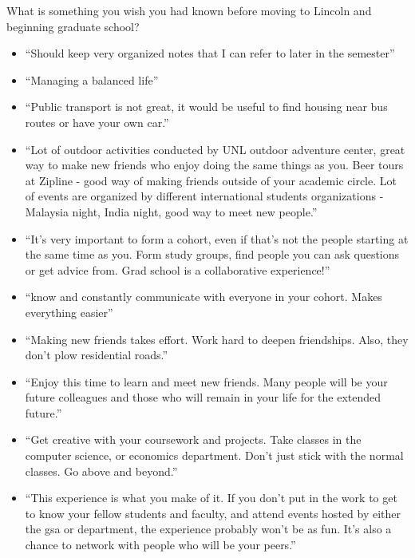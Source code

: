 \documentclass[
  12pt,
]{book}
\providecommand{\tightlist}{%
  \setlength{\itemsep}{0pt}\setlength{\parskip}{0pt}}
\begin{document}
What is something you wish you had known before moving to Lincoln and beginning graduate school?

\begin{itemize}
\tightlist
\item
  ``Should keep very organized notes that I can refer to later in the semester''
\item
  ``Managing a balanced life''
\item
  ``Public transport is not great, it would be useful to find housing near bus routes or have your own car.''
\item
  ``Lot of outdoor activities conducted by UNL outdoor adventure center, great way to make new friends who enjoy doing the same things as you. Beer tours at Zipline - good way of making friends outside of your academic circle. Lot of events are organized by different international students organizations - Malaysia night, India night, good way to meet new people.''
\item
  ``It's very important to form a cohort, even if that's not the people starting at the same time as you. Form study groups, find people you can ask questions or get advice from. Grad school is a collaborative experience!''
\item
  ``know and constantly communicate with everyone in your cohort. Makes everything easier''
\item
  ``Making new friends takes effort. Work hard to deepen friendships. Also, they don't plow residential roads.''
\item
  ``Enjoy this time to learn and meet new friends. Many people will be your future colleagues and those who will remain in your life for the extended future.''
\item
  ``Get creative with your coursework and projects. Take classes in the computer science, or economics department. Don't just stick with the normal classes. Go above and beyond.''
\item
  ``This experience is what you make of it. If you don't put in the work to get to know your fellow students and faculty, and attend events hosted by either the gsa or department, the experience probably won't be as fun. It's also a chance to network with people who will be your peers.''
\end{itemize}
\end{document}
